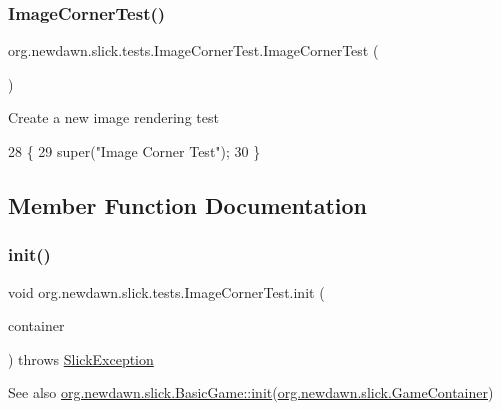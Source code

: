 \subsubsection{\texorpdfstring{Image\+Corner\+Test()}{ImageCornerTest()}}
{\footnotesize\ttfamily org.\+newdawn.\+slick.\+tests.\+Image\+Corner\+Test.\+Image\+Corner\+Test (\begin{DoxyParamCaption}{ }\end{DoxyParamCaption})\hspace{0.3cm}{\ttfamily [inline]}}

Create a new image rendering test 
\begin{DoxyCode}
28                              \{
29         super(\textcolor{stringliteral}{"Image Corner Test"});
30     \}
\end{DoxyCode}


\subsection{Member Function Documentation}
\mbox{\label{classorg_1_1newdawn_1_1slick_1_1tests_1_1_image_corner_test_ada813543c521f67360f6e89f8c63ca72}} 
\subsubsection{\texorpdfstring{init()}{init()}}
{\footnotesize\ttfamily void org.\+newdawn.\+slick.\+tests.\+Image\+Corner\+Test.\+init (\begin{DoxyParamCaption}\item[{\mbox{\hyperlink{classorg_1_1newdawn_1_1slick_1_1_game_container}{Game\+Container}}}]{container }\end{DoxyParamCaption}) throws \mbox{\hyperlink{classorg_1_1newdawn_1_1slick_1_1_slick_exception}{Slick\+Exception}}\hspace{0.3cm}{\ttfamily [inline]}}

\begin{DoxySeeAlso}{See also}
\mbox{\hyperlink{classorg_1_1newdawn_1_1slick_1_1_basic_game_a8af0900217e4d389249f71367b22d114}{org.\+newdawn.\+slick.\+Basic\+Game\+::init}}(\mbox{\hyperlink{classorg_1_1newdawn_1_1slick_1_1_game_container}{org.\+newdawn.\+slick.\+Game\+Container}}) 
\end{DoxySeeAlso}


